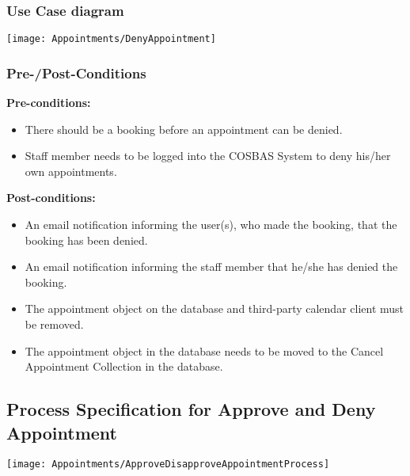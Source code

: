 \subsubsection{Use Case diagram}
\texttt{[image: Appointments/DenyAppointment]}

\subsubsection{Pre-/Post-Conditions}\textbf{Pre-conditions:} 
	\begin{itemize}
		\item There should be a booking before an appointment can be denied.
		\item Staff member needs to be logged into the COSBAS System to deny his/her own appointments.
	\end{itemize}
\textbf{ Post-conditions:} 
	\begin{itemize}
		\item An email notification informing the user(s), who made the booking, that the booking has been denied.
		\item An email notification informing the staff member that he/she has denied the booking.
		\item The appointment object on the database and third-party calendar client must be removed.
		\item The appointment object in the database needs to be moved to the Cancel Appointment Collection in the database.
	\end{itemize}	

\subsection{Process Specification for Approve and Deny Appointment}
	\texttt{[image: Appointments/ApproveDisapproveAppointmentProcess]}	